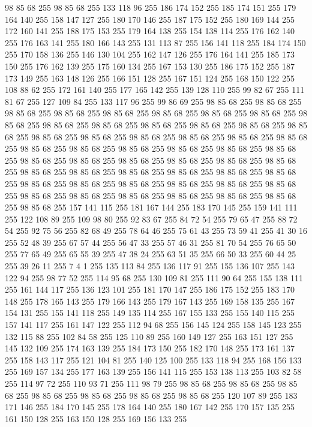 98 85 68 255 98 85 68 255 133 118 96 255 186 174 152 255 185 174 151 255 179 164 140 255 158 147 127 255 180 170 146 255 187 175 152 255 180 169 144 255 172 160 141 255 188 175 153 255 179 164 138 255 154 138 114 255 176 162 140 255 176 163 141 255 180 166 143 255 131 113 87 255 156 141 118 255 184 174 150 255 170 158 136 255 146 130 104 255 162 147 126 255 176 164 141 255 185 173 150 255 176 162 139 255 175 160 134 255 167 153 130 255 186 175 152 255 187 173 149 255 163 148 126 255 166 151 128 255 167 151 124 255 168 150 122 255 108 88 62 255 172 161 140 255 177 165 142 255 139 128 110 255 99 82 67 255 111 81 67 255 127 109 84 255 133 117 96 255 99 86 69 255 98 85 68 255 98 85 68 255 98 85 68 255 98 85 68 255 98 85 68 255 98 85 68 255 98 85 68 255 98 85 68 255 98 85 68 255 98 85 68 255 98 85 68 255 98 85 68 255 98 85 68 255 98 85 68 255 98 85 68 255 98 85 68 255 98 85 68 255 98 85 68 255 98 85 68 255 98 85 68 255 98 85 68 255
98 85 68 255 98 85 68 255 98 85 68 255 98 85 68 255 98 85 68 255 98 85 68 255 98 85 68 255 98 85 68 255 98 85 68 255 98 85 68 255 98 85 68 255 98 85 68 255 98 85 68 255 98 85 68 255 98 85 68 255 98 85 68 255 98 85 68 255 98 85 68 255 98 85 68 255 98 85 68 255 98 85 68 255 98 85 68 255 98 85 68 255 98 85 68 255 98 85 68 255 98 85 68 255 98 85 68 255 98 85 68 255 98 85 68 255 98 85 68 255 98 85 68 255 157 141 115 255 181 167 144 255 183 170 145 255 159 141 111 255 122 108 89 255 109 98 80 255 92 83 67 255 84 72 54 255 79 65 47 255 88 72 54 255 92 75 56 255 82 68 49 255 78 64 46 255 75 61 43 255 73 59 41 255 41 30 16 255 52 48 39 255 67 57 44 255 56 47 33 255 57 46 31 255 81 70 54 255 76 65 50 255 77 65 49 255 65 55 39 255 47 38 24 255 63 51 35 255 66 50 33 255 60 44 25 255 39 26 11 255 7 4 1 255 135 113 84 255 136 117 91 255 155 136 107 255
143 122 94 255 98 77 52 255 114 95 68 255 130 109 81 255 111 90 64 255 155 138 111 255 161 144 117 255 136 123 101 255 181 170 147 255 186 175 152 255 183 170 148 255 178 165 143 255 179 166 143 255 179 167 143 255 169 158 135 255 167 154 131 255 155 141 118 255 149 135 114 255 167 155 133 255 155 140 115 255 157 141 117 255 161 147 122 255 112 94 68 255 156 145 124 255 158 145 123 255 132 115 88 255 102 84 58 255 125 110 89 255 160 149 127 255 163 151 127 255 145 132 109 255 174 163 139 255 184 173 150 255 182 170 148 255 173 161 137 255 158 143 117 255 121 104 81 255 140 125 100 255 133 118 94 255 168 156 133 255 169 157 134 255 177 163 139 255 156 141 115 255 153 138 113 255 103 82 58 255 114 97 72 255 110 93 71 255 111 98 79 255 98 85 68 255 98 85 68 255 98 85 68 255 98 85 68 255 98 85 68 255 98 85 68 255 98 85 68 255 120 107 89 255 183 171 146 255 184 170 145 255 178 164 140 255 180 167 142 255 170 157 135 255 161 150 128 255 163 150 128 255 169 156 133 255
